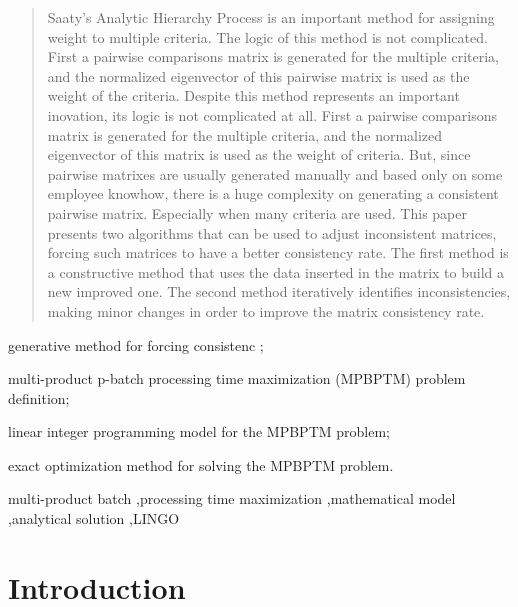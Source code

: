 \documentclass[authoryear,manuscript,12pt]{elsarticle}
\begin{document}
\begin{frontmatter}
\begin{abstract} 
Saaty's Analytic Hierarchy Process is an important method for assigning weight to multiple criteria. The logic of this method is not complicated. First a pairwise comparisons matrix is generated for the multiple criteria, and the normalized eigenvector of this pairwise matrix is used as the weight of the criteria. Despite this method represents an important inovation, its logic is not complicated at all. First a pairwise comparisons matrix is generated for the multiple criteria, and the normalized eigenvector of this matrix is used as the weight of criteria. But, since pairwise matrixes are usually generated manually and based only on some employee knowhow, there is a huge complexity on generating a consistent pairwise matrix. Especially when many criteria are used. This paper presents two algorithms that can be used to adjust inconsistent matrices, forcing such matrices to have a better consistency rate. The first method is a constructive method that uses the data inserted in the matrix to build a new improved one. The second method iteratively identifies inconsistencies, making minor changes in order to improve the matrix consistency rate. 
\end{abstract}

\begin{highlights}
\item generative method for forcing consistenc ;
\item multi-product p-batch processing time maximization (MPBPTM) problem definition;
\item linear integer programming model for the MPBPTM problem;
\item exact optimization method for solving the MPBPTM problem.
\end{highlights}

\begin{keyword}
multi-product batch \sep processing time maximization \sep mathematical model \sep analytical solution \sep LINGO
\end{keyword}
\end{frontmatter}


\section{Introduction}
\label{sec:intro}
\end{document}
